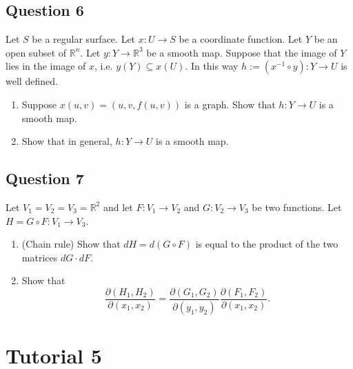 \documentclass[12pt, a4paper]{article}
\newcommand{\R}{\mathbb{R}}
\begin{document}
\subsection*{Question 6}
Let $S$ be a regular surface. Let $x:U\rightarrow S$ be a coordinate function. Let $Y$ be an open subset of $\R^{n}$. Let $y:Y\rightarrow\R^{3}$ be a smooth map. Suppose that the image of $Y$ lies in the image of $x$, i.e. $y(Y)\subseteq x(U)$. In this way $h := (x^{-1} \circ y): Y \rightarrow U$ is well defined.
\begin{enumerate}[label=(\roman*)]
    \item Suppose $x(u,v)=(u,v,f(u,v))$ is a graph. Show that $h: Y\rightarrow U$ is a smooth map.
    \item Show that in general, $h:Y\rightarrow U$ is a smooth map.
\end{enumerate}
\newpage

\subsection*{Question 7}
Let $V_{1}=V_{2}=V_{3}=\R^{2}$ and let $F:V_{1}\rightarrow V_{2}$ and $G:V_{2}\rightarrow V_{3}$ be two functions. Let $H=G\circ F:V_{1}\rightarrow V_{3}$.

\begin{enumerate}[label=(\roman*)]
    \item (Chain rule) Show that $dH=d(G\circ F)$ is equal to the product of the two matrices $dG\cdot dF$.
    \item Show that
    \[ \frac{\partial(H_{1},H_{2})}{\partial(x_{1},x_{2})}=\frac{\partial(G_{1},G_{2})}{\partial(y_{1},y_{2})}\frac{\partial(F_{1},F_{2})}{\partial(x_{1},x_{2})}. \]
\end{enumerate}
\newpage

\section*{Tutorial 5}
\end{document}
